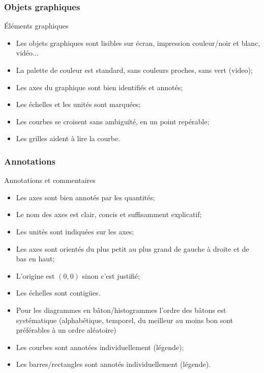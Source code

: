 \documentclass[xcolor=x11names,compress,8pt,fleqn]{beamer}
\renewcommand{\(}{\begin{columns}}
\renewcommand{\)}{\end{columns}}
\newcommand{\<}[1]{\begin{column}{#1}}
\renewcommand{\>}{\end{column}}
\begin{document}
\begin{frame}
\frametitle{Objets graphiques}
\begin{alertblock}{Éléments graphiques}
\begin{itemize}
\item  Les objets graphiques sont lisibles sur écran, impression couleur/noir et blanc, vidéo...
\item  La palette de couleur est standard, sans couleurs proches, sans vert (video); 
\item  Les axes du graphique sont bien identifiés et annotés; 
\item  Les échelles et les unités sont marquées; 
\item  Les courbes se croisent sans ambiguïté, en un point repérable; 
\item  Les grilles aident à lire la courbe.
\end{itemize}
\end{alertblock}
\end{frame}
\begin{frame}
\frametitle{Annotations}
\begin{alertblock}{Annotations et commentaires }
\begin{itemize}
\item  Les axes sont bien annotés par les quantités; 
\item  Le nom des axes est clair, concis et suffisamment explicatif;
\item  Les unités sont indiquées sur les axes;
\item  Les axes sont orientés du plus petit au plus grand de gauche à droite et de bas en haut;
\item  L'origine est $(0,0)$ sinon c'est justifié;
\item  Les échelles sont contigües.
\item  Pour les diagrammes en bâton/histogrammes l'ordre des bâtons est systématique (alphabétique, temporel, du meilleur au moins bon sont préférables à un ordre aléatoire)
\item  Les courbes sont annotées individuellement (légende); 
\item  Les barres/rectangles sont annotés individuellement (légende).
\end{itemize}
\end{alertblock}
\end{frame}
\end{document}
